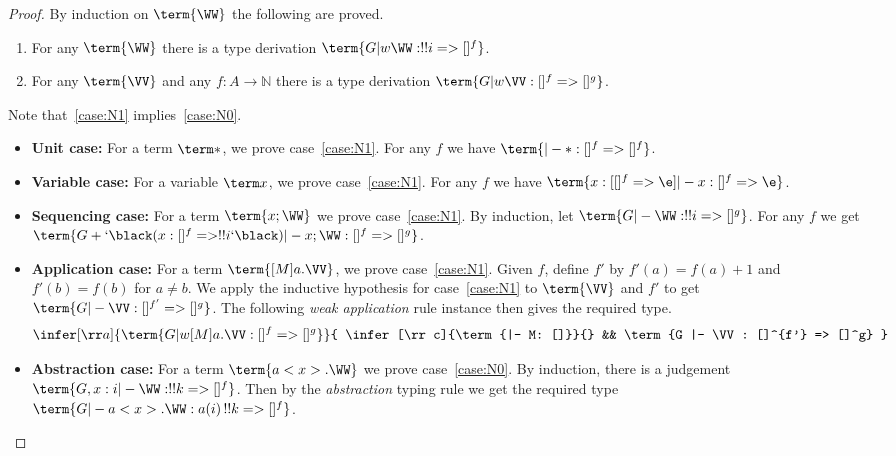\documentclass[10pt,a4paper]{amsart}
\newcommand\case[1]{\textbf{#1}}
\begin{document}
\begin{proof}
By induction on $\term{\WW}$ the following are proved.
\begin{enumerate}
	\item\label{case:N0} For any $\term{\WW}$ there is a type derivation $\term{G |w \WW: !!i => []^f}$.
	\item\label{case:N1} For any $\term{\VV}$ and any $f:A\to\mathbb N$ there is a type derivation $\term{G |w \VV: []^f => []^g}$.
\end{enumerate}
Note that~\ref{case:N1} implies~\ref{case:N0}.

\begin{itemize}

\item\case{Unit case:}
For a term $\term *$, we prove case~\ref{case:N1}. For any $f$ we have $\term{|- *:[]^f => []^f}$.

\item\case{Variable case:}
For a variable $\term x$, we prove case~\ref{case:N1}. For any $f$ we have $\term{x:[[]^f=>\e] |- x: []^f => \e}$.

\item\case{Sequencing case:}
For a term $\term{x;\WW}$ we prove case~\ref{case:N1}. By induction, let $\term{G |- \WW: !!i => []^g}$. For any $f$ we get $\term{G + `{\black(}x:[]^f=>!!i`{\black)} |- x;\WW : []^f => []^g}$.

\item\case{Application case:}
For a term $\term{[M]a.\VV}$, we prove case~\ref{case:N1}. Given $f$, define $f'$ by $f'(a)=f(a)+1$ and $f'(b)=f(b)$ for $a\neq b$. We apply the inductive hypothesis for case~\ref{case:N1} to $\term{\VV}$ and $f'$ to get $\term{G |- \VV: []^{f'} => []^g}$. The following \emph{weak application} rule instance then gives the required type.
\[
\infer[\rr a]{\term{G |w [M]a.\VV : []^f => []^g}}{
   \infer[\rr c]{\term{|- M: []}}{}
&& \term{G |- \VV: []^{f'} => []^g}
}
\]

\item\case{Abstraction case:}
For a term $\term{a<x>.\WW}$ we prove case~\ref{case:N0}. By induction, there is a judgement $\term{G , x:i |- \WW : !!k => []^f}$. Then by the \emph{abstraction} typing rule we get the required type $\term{G |- a<x>.\WW : a(i)\,!!k => []^f}$.
\qedhere
\end{itemize}
\end{proof}


\weightedSpine*
\end{document}
